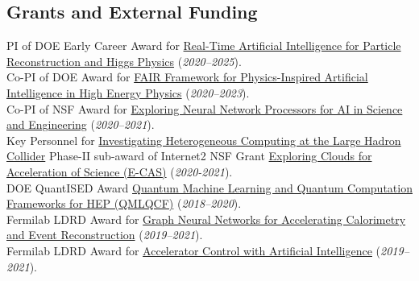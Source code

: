 \documentclass[11pt]{res}
\newcommand{\MarginText}[1]{\section{#1}\vspace{10pt}}
\begin{document}
\begin{resume}
\MarginText{Grants and External Funding}
PI of DOE Early Career Award for \href{https://science.osti.gov/-/media/early-career/pdf/FY20_DOE_SC_Early_Career_Research_Program_Abstracts.pdf}{Real-Time Artificial Intelligence for Particle Reconstruction and Higgs Physics} (\textit{2020--2025}).\\
Co-PI of DOE Award for \href{https://science.osti.gov/-/media/ascr/pdf/programdocuments/docs/2020/List_of_Awards_FAIR_Data.pdf}{FAIR Framework for Physics-Inspired Artificial Intelligence in
High Energy Physics} (\textit{2020--2023}).\\
Co-PI of NSF Award for \href{https://nsf.gov/awardsearch/showAward?AWD_ID=2005369}{Exploring Neural Network Processors for AI in Science and Engineering} (\textit{2020--2021}).\\
Key Personnel for \href{https://www.internet2.edu/news/detail/17957/}{Investigating Heterogeneous Computing at the Large Hadron Collider} Phase-II sub-award of Internet2 NSF Grant \href{https://www.nsf.gov/awardsearch/showAward?AWD_ID=1904444}{Exploring Clouds for Acceleration of Science (E-CAS)} (\textit{2020-2021}).\\
DOE QuantISED Award \href{https://pamspublic.science.energy.gov/WebPAMSExternal/Interface/Common/ViewPublicAbstract.aspx?rv=1f7d4729-6f93-40bd-a55f-c108545b1ea9&rtc=24&PRoleId=10}{Quantum Machine Learning and Quantum Computation Frameworks for HEP (QMLQCF)} (\textit{2018--2020}).\\
Fermilab LDRD Award for \href{https://ldrd.fnal.gov/subdir/FNAL-LDRD-2019-017-D1.pdf}{Graph Neural Networks for Accelerating Calorimetry and Event Reconstruction} (\textit{2019--2021}).\\
Fermilab LDRD Award for \href{https://ldrd.fnal.gov/subdir/FNAL-LDRD-2019-027-D1.pdf}{Accelerator Control with Artificial Intelligence} (\textit{2019--2021}).



\end{resume}
\end{document}
